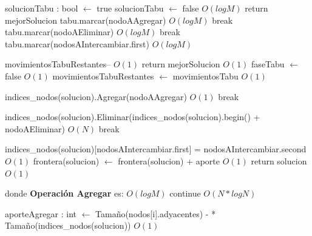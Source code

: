 \documentclass[a4paper, 10pt, twoside]{article}
\newenvironment{pseudo}[1][]{%
    \vspace{1em}%
    \begin{algorithmic}%
}
{%
    \end{algorithmic}%
    \vspace{1em}%
}
\newcommand{\Ode}[1]{\hfill $O(#1)$}
\begin{document}
\begin{pseudo}
				\State solucionTabu : bool $\leftarrow$ true
					 solucionTabu $\leftarrow$ false \EndIf \Ode{log M}
				\EndFor
				\State
				 return mejorSolucion \EndIf
				\State
					    \State tabu.marcar(nodoAAgregar)										 	\Ode{log M}	
					    \State break
					\EndCase
						\State  tabu.marcar(nodoAEliminar) 											\Ode{log M}
						\State break
					\EndCase
						\State tabu.marcar(nodosAIntercambiar.first)								\Ode{log M}
					\EndCase
				\EndSwitch

				\State movimientosTabuRestantes--													\Ode{1}
				 return mejorSolucion
				\EndIf
		\Else
				          \Ode{1}
					\State faseTabu $\leftarrow$ false 												\Ode{1}
					\State movimientosTabuRestantes $\leftarrow$ movimientosTabu 					\Ode{1}
				\EndIf
		\EndIf


			    \State indices\_nodos(solucion).Agregar(nodoAAgregar) 								\Ode{1}
			    \State break
		    \EndCase

			    \State indices\_nodos(solucion).Eliminar(indices\_nodos(solucion).begin() + nodoAEliminar) \Ode{N}
			    \State break
		    \EndCase

			    \State indices\_nodos(solucion)[nodosAIntercambiar.first] = nodosAIntercambiar.second    \Ode{1}
		    \EndCase
		\EndSwitch
		\State
		\State frontera(solucion) $\leftarrow$ frontera(solucion) + aporte 								\Ode{1}
	\EndWhile
	\State return solucion 																			\Ode{1}

\EndProcedure

\State donde \textbf{Operación Agregar} es:
\State
																					\Ode{log M}
			\State continue
			\EndIf
											\Ode{N*log N}

				\State aporteAgregar : int $\leftarrow$ Tamaño(nodos[i].adyacentes) - 
				 * Tamaño(indices\_nodos(solucion))															\Ode{1}


\end{pseudo}
\end{document}
